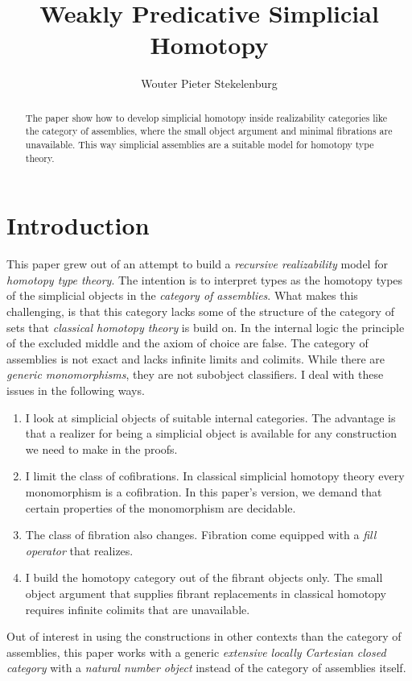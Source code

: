 \documentclass{tac}
\title{Weakly Predicative Simplicial Homotopy}
\author{Wouter Pieter Stekelenburg}\copyrightyear{2015}
\newcommand\hide[1]{}
\begin{document}
\begin{abstract} The paper show how to develop simplicial homotopy inside realizability categories like the category of assemblies, where the small object argument and minimal fibrations are unavailable. This way simplicial assemblies are a suitable model for homotopy type theory.\end{abstract}

\hide{
Three papers:
-simplicial homotopy
-complete categories
-the realizability model of HOTT
}

\maketitle

\hide{
Thorough investigation of the background. If we have an ELCCC then the poset-reflection is a Heyting algebra. The reindexing morphisms between the poset reflections are Heyting algebra morphisms and its adjoints remain adjoints.

}

\section{Introduction}
This paper grew out of an attempt to build a \emph{recursive realizability} model for \emph{homotopy type theory}. The intention is to interpret types as the homotopy types of the simplicial objects in the \emph{category of assemblies}. What makes this challenging, is that this category lacks some of the structure of the category of sets that \emph{classical homotopy theory} is build on. In the internal logic the principle of the excluded middle and the axiom of choice are false. The category of assemblies is not exact and lacks infinite limits and colimits. While there are \emph{generic monomorphisms}, they are not subobject classifiers. I deal with these issues in the following ways.
\begin{enumerate}
\item I look at simplicial objects of suitable internal categories. The advantage is that a realizer for being a simplicial object is available for any construction we need to make in the proofs.
\item I limit the class of cofibrations. In classical simplicial homotopy theory every monomorphism is a cofibration. In this paper's version, we demand that certain properties of the monomorphism are decidable.
\item The class of fibration also changes. Fibration come equipped with a \emph{fill operator} that realizes.
\item I build the homotopy category out of the fibrant objects only. The small object argument that supplies fibrant replacements in classical homotopy requires infinite colimits that are unavailable.
\end{enumerate}
Out of interest in using the constructions in other contexts than the category of assemblies, this paper works with a generic \emph{extensive locally Cartesian closed category} with a \emph{natural number object} instead of the category of assemblies itself.
\end{document}
